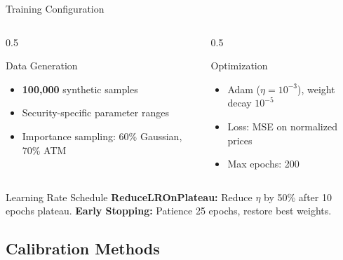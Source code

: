 \documentclass{beamer}
\begin{document}
\begin{frame}{Training Configuration}
    \begin{columns}
        \begin{column}{0.5\textwidth}
            \begin{block}{Data Generation}
                \begin{itemize}
                    \item \textbf{100,000} synthetic samples
                    \item Security-specific parameter ranges
                    \item Importance sampling: 60\% Gaussian, 70\% ATM
                \end{itemize}
            \end{block}
        \end{column}
        \begin{column}{0.5\textwidth}
            \begin{block}{Optimization}
                \begin{itemize}
                    \item Adam ($\eta=10^{-3}$), weight decay $10^{-5}$
                    \item Loss: MSE on normalized prices
                    \item Max epochs: 200
                \end{itemize}
            \end{block}
        \end{column}
    \end{columns}

    \vspace{0.2cm}

    \begin{block}{Learning Rate Schedule}
        \textbf{ReduceLROnPlateau:} Reduce $\eta$ by 50\% after 10 epochs plateau.
        \textbf{Early Stopping:} Patience 25 epochs, restore best weights.
    \end{block}
\end{frame}

\subsection{Calibration Methods}
\end{document}
